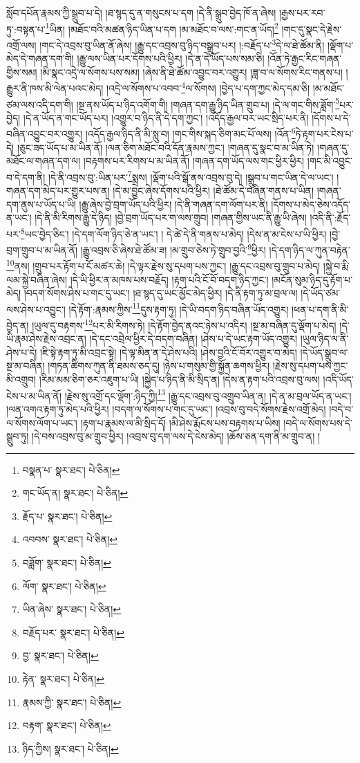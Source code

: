 སློབ་དཔོན་རྣམས་ཀྱི་སྒྲུབ་པ་དེ། །ཐ་སྙད་དུ་ན་གསུངས་པ་དག །དེ་ནི་སྒྲུབ་བྱེད་ཁོ་ན་ཞེས། །རྒྱས་པར་རབ་ཏུ་:བསྟན་པ་\footnote{བསྣན་པ་  སྣར་ཐང་།  པེ་ཅིན། }ཡིན། །མཐོང་བའི་མཚན་ཉིད་ཡིན་པ་དག །མ་མཐོང་བ་ལས་:གང་ན་ཡོད།\footnote{གང་ཡོད་ན།  སྣར་ཐང་།  པེ་ཅིན། } །གང་དུ་སྣང་དེ་རྗེས་འགྲོ་ལས། །གང་དེ་འབྲས་བུ་ཡིན་ནོ་ཞེས། །རྒྱུ་དང་འབྲས་བུ་ཉིད་བསྒྲུབ་པར། །:བརྗོད་པ་\footnote{རྗོད་པ་  སྣར་ཐང་།  པེ་ཅིན། }དེ་ལ་ཐེ་ཚོམ་ནི། །ལྡོག་པ་མེད་དེ་གཞན་དག་གི། །རྒྱུ་ལས་ཡིན་པར་དོགས་པའི་ཕྱིར། །དེ་ན་དེ་ཡོད་པས་སམ་ཅི། །འོན་ཏེ་རྒྱང་རིང་གཞན་གྱིས་སམ། །མི་སྣང་འདྲེ་ལ་སོགས་པས་སམ། །ཞེས་ནི་ཐེ་ཚོམ་འབྱུང་བར་འགྱུར། །ཟླ་བ་ལ་སོགས་རིང་གནས་པ། །རྒྱུར་ནི་ཁས་མི་ལེན་པའང་མེད། །འདྲེ་ལ་སོགས་པ་འབབ་\footnote{འབབས་  སྣར་ཐང་།  པེ་ཅིན། }ལ་སོགས། །བྱེད་པ་དག་ཀྱང་མེད་དམ་ཅི། །མ་མཐོང་ཙམ་ལས་འདི་དག་གི། །སྔ་ནས་ཡོད་པ་ཉིད་འགོག་གི། །གཞན་དག་རྒྱུ་ཉིད་ཡིན་གྲུབ་པ། །དེ་ལ་གང་གིས་ཟློག་\footnote{བཟློག་  སྣར་ཐང་།  པེ་ཅིན། }པར་བྱེད། །དེ་ན་ཡོད་ན་གང་ཡོད་པར། །འགྱུར་བ་ཉིད་ནི་དེ་དག་ཀྱང་། །འདོད་རྒྱལ་བར་ཡང་སྲིད་པར་ནི། །དོགས་པ་དེ་བཞིན་འབྱུང་བར་འགྱུར། །འདོད་རྒྱལ་ཉིད་ནི་མི་སླུ་བ། །གང་གིས་སྐད་ཅིག་མང་པོ་ལས། །འོན་\footnote{ལོག་  སྣར་ཐང་།  པེ་ཅིན། }ཏེ་རྟག་པར་ངེས་པ་དེ། །ཅུང་ཟད་ཡོད་པ་མ་ཡིན་ནོ། །ལན་ཅིག་མཐོང་བའི་དོན་རྣམས་ཀྱང་། །གཞན་དུ་སྣང་བ་མ་ཡིན་ཏེ། །གཞན་དུ་མཐོང་ལ་གཞན་དག་ལ། །བརྟགས་པར་རིགས་པ་མ་ཡིན་ནོ། །གཞན་དག་ཡོད་ལས་གང་ཕྱིར་ཕྱིར། །གང་མི་འབྱུང་བ་དེ་དག་ནི། །དེ་ནི་འབྲས་བུ་:ཡིན་པར་\footnote{ཡིན་ཞེས་  སྣར་ཐང་།  པེ་ཅིན། }སྨྲས། །ལྡོག་པའི་སྒོ་ནས་འབྲས་བུ་དེ། །སྒྲུབ་པ་གང་ཡིན་དེ་ལ་ཡང་། །གཞན་དག་མེད་པར་གྱུར་པས་ན། །དེ་མ་བྱུང་ཞེས་དོགས་པའི་ཕྱིར། །ཐེ་ཚོམ་དེ་བཞིན་གནས་པ་ཡིན། །གཞན་དག་ནུས་པ་ཡོད་པ་ཡི། །རྒྱུ་ཞེས་བྱེ་བྲག་ཡོད་པའི་ཕྱིར། །དེ་ནི་གཞན་དག་ལོག་པར་ནི། །དོགས་པ་མེད་ཅེས་འདོད་ན་ཡང་། །དེ་ནི་མི་རིགས་རྒྱུ་དེ་ཉིད། །བྱེ་བྲག་ཡོད་པར་ག་ལས་གྲུབ། །གཞན་གྱིས་ཡང་ནི་རྒྱུ་ཡི་ཞེས། །འདི་ནི་:རྗོད་པར་\footnote{བརྗོད་པར་  སྣར་ཐང་།  པེ་ཅིན། }ཡང་བྱེད་ཅིང་། །དེ་དག་ལོག་ཉིད་ཅེ་ན་ཡང་། །
དེ་ཚེ་དེ་ནི་གནས་པ་མེད། །དེས་ན་མ་ངེས་པ་ཡི་ཕྱིར། །བྱེ་བྲག་གྲུབ་པ་མ་ཡིན་ནོ། །རྒྱུ་འབྲས་ཅི་ཞེས་ཐེ་ཚོམ་ཟ། །མ་གྲུབ་ཅེས་ཏེ་གྲུབ་བྱའི་\footnote{བྱ་  སྣར་ཐང་།  པེ་ཅིན། }ཕྱིར། །དེ་དག་ཉིད་ལ་ཀུན་བརྟེན་\footnote{རྟེན་  སྣར་ཐང་།  པེ་ཅིན། }ནས། །གྲུབ་པར་རྟོག་པ་ངོ་མཚར་ཆེ། །དེ་ལྟར་རྗེས་སུ་དཔག་པས་ཀྱང་། །རྒྱུ་དང་འབྲས་བུ་གྲུབ་པ་མེད། །སྐྱེ་བ་རྨི་ལམ་སྐྱེ་བཞིན་ཞེས། །དེ་ཡི་ཕྱིར་ན་མཁས་པས་བརྗོད། །རྟག་པའི་ངོ་བོ་བདག་ཉིད་ཀྱང་། །མངོན་སུམ་ཉིད་དུ་རྟོག་པ་མེད། །བདག་སོགས་ཤེས་པ་གང་དུ་ཡང་། །ཐ་སྙད་དུ་ཡང་མྱོང་མེད་ཕྱིར། །དེ་ནི་རྟག་ཏུ་མ་བྲལ་ལ། །དེ་ཡོད་ཙམ་ལས་ཤེས་པ་འབྱུང་། །དེ་རྟོག་:རྣམས་ཀྱིས་\footnote{རྣམས་ཀྱི་  སྣར་ཐང་།  པེ་ཅིན། }དུས་རྟག་ཏུ། །དེ་ཡི་བདག་ཉིད་བཞིན་ཡོད་འགྱུར། །ཕན་པ་དག་ནི་མི་བྱེད་ན། །ཡུལ་དུ་བརྟགས་\footnote{བརྟག་  སྣར་ཐང་།  པེ་ཅིན། }པར་མི་རིགས་ཏེ། །དེ་རྟོག་བྱེད་ནའང་ཉེས་པ་འདིར། །སྔ་མ་བཞིན་དུ་ལྡོག་པ་མེད། །དེ་ཡི་རྣམ་ཤེས་རྗེས་འབྲང་ན། །དེ་དང་འབྲེལ་ཕྱིར་དེ་བདག་བཞིན། །ཤེས་པ་དེ་ཡང་རྟག་ཡོད་འགྱུར། །ཡུལ་ཉིད་ལ་ནི་ཤེས་པ་དེ། །ཇི་སྟེ་རྟག་ཏུ་མི་འབྲང་སྟེ། །དེ་ལྟ་མིན་ན་དེ་ཤེས་པའི། །ཤེས་བྱའི་ངོ་བོར་འགྱུར་བ་མེད། །དེ་ཡོད་སྒྲུབ་ལ་སྔ་མ་བཞིན། །གཏན་ཚིགས་ཀུན་ནི་ཐམས་ཅད་དུ། །ཉེས་པ་གསུམ་གྱི་སྐྱོན་ཆགས་ཕྱིར། །རྗེས་སུ་དཔག་པས་ཀྱང་མི་འགྲུབ། །རིམ་མམ་ཅིག་ཅར་འཇུག་པ་ཡི། །སྐྱེད་པ་ཉིད་ནི་མི་སྲིད་ན། །དེས་ན་རྟག་པའི་འབྲས་བུ་ལས། །འདི་ཡོད་ངེས་པ་མ་ཡིན་ནོ། །རྗེས་སུ་འགྲོ་དང་ལྡོག་:ཉིད་ཀྱི།\footnote{ཉིད་ཀྱིས།  སྣར་ཐང་།  པེ་ཅིན། } །རྒྱུ་དང་འབྲས་བུ་འགྲུབ་ཡིན་ན། །དེ་ན་མ་བྲལ་ཡོད་ན་ཡང་། །ལན་འགའ་རྟག་ཏུ་མེད་པའི་ཕྱིར། །བདག་ལ་སོགས་པ་གང་དུ་ཡང་། །འབྲས་བུ་བདེ་སོགས་རྗེས་འགྲོ་མེད། །བདེ་བ་ལ་སོགས་ལོག་པ་ཡང་། །རྟག་པ་རྣམས་ལ་མི་སྲིད་དོ། །མི་ཤེས་རྨོངས་པས་བརྟགས་པ་ཡིས། །བདེ་ལ་སོགས་པས་དེ་སྒྲུབ་ཏུ། །དེ་བས་འབྲས་བུ་མ་གྲུབ་ཕྱིར། །འབྲས་བུ་དག་ལས་དེ་ངེས་མེད། །ཆོས་ཅན་དག་ནི་མ་གྲུབ་ན། །
